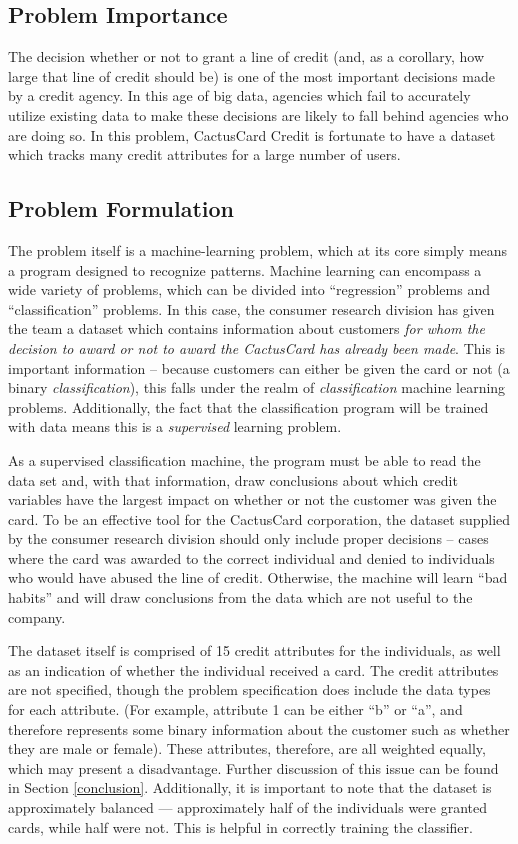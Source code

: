 \documentclass[11pt,journal]{IEEEtran}
\begin{document}
\subsection{Problem Importance}
The decision whether or not to grant a line of credit (and, as a corollary, how large that line of credit should be) is one of the most important decisions made by a credit agency. In this age of big data, agencies which fail to accurately utilize existing data to make these decisions are likely to fall behind agencies who are doing so. In this problem, CactusCard Credit is fortunate to have a dataset which tracks many credit attributes for a large number of users.

\subsection{Problem Formulation}
The problem itself is a machine-learning problem, which at its core simply means a program designed to recognize patterns. Machine learning can encompass a wide variety of problems, which can be divided into ``regression'' problems and ``classification'' problems. In this case, the consumer research division has given the team a dataset which contains information about customers \emph{for whom the decision to award or not to award the CactusCard has already been made}. This is important information -- because customers can either be given the card or not (a binary \emph{classification}), this falls under the realm of \emph{classification} machine learning problems. Additionally, the fact that the classification program will be trained with data means this is a \emph{supervised} learning problem.
\par
As a supervised classification machine, the program must be able to read the data set and, with that information, draw conclusions about which credit variables have the largest impact on whether or not the customer was given the card. To be an effective tool for the CactusCard corporation, the dataset supplied by the consumer research division should only include proper decisions -- cases where the card was awarded to the correct individual and denied to individuals who would have abused the line of credit. Otherwise, the machine will learn ``bad habits'' and will draw conclusions from the data which are not useful to the company.
\par
The dataset itself is comprised of 15 credit attributes for the individuals, as well as an indication of whether the individual received a card. The credit attributes are not specified, though the problem specification does include the data types for each attribute. (For example, attribute 1 can be either ``b'' or ``a'', and therefore represents some binary information about the customer such as whether they are male or female). These attributes, therefore, are all weighted equally, which may present a disadvantage. Further discussion of this issue can be found in Section \ref{conclusion}. Additionally, it is important to note that the dataset is approximately balanced --- approximately half of the individuals were granted cards, while half were not. This is helpful in correctly training the classifier.
\end{document}
